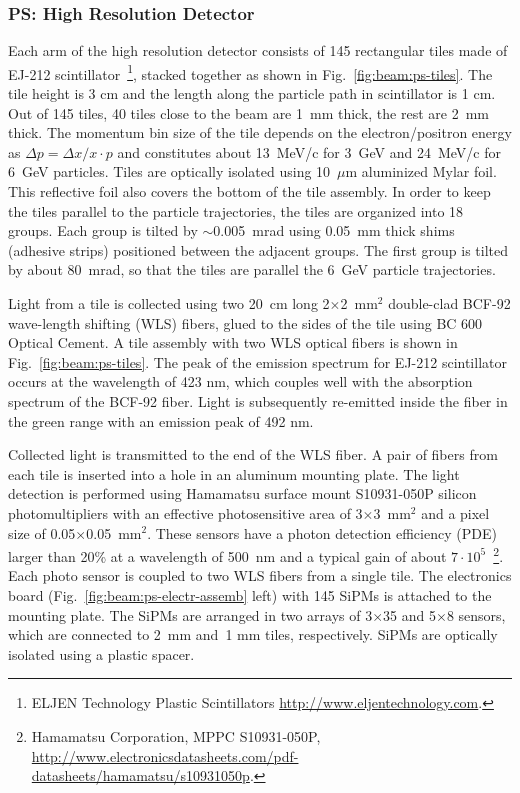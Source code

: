 \subsubsection[PS: High Resolution Detector]{PS: High Resolution Detector
  \label{sec:beamline:ps-hresol}
}

Each arm of the high resolution detector consists of 145 rectangular
tiles made of EJ-212 scintillator~\footnote{
  ELJEN Technology Plastic Scintillators \url{http://www.eljentechnology.com}. 
}, stacked together as
shown in Fig.~\ref{fig:beam:ps-tiles}. The tile height is 3 cm and the
length along the particle path in scintillator is 1 cm. Out of 145 tiles,
40 tiles close to the beam are 1~mm thick, the rest are 2~mm thick.
 The momentum
bin size of the tile depends on the electron/positron energy as 
$\Delta{}p=\Delta{}x/x\cdot{}p$ 
and constitutes about 13~MeV/c for 3~GeV and 24~MeV/c for 6~GeV particles.
Tiles are optically isolated using 10~$\mu$m
aluminized Mylar foil. This reflective foil also covers the bottom of
the tile assembly. In order to keep the tiles parallel to the
particle trajectories, the tiles are organized into 18 groups. Each
group is tilted by $\sim$0.005~mrad using 0.05~mm thick shims
(adhesive strips) positioned between the adjacent groups. The 
first group is tilted by about 80~mrad, so that the tiles are parallel
the 6~GeV particle trajectories.

Light from a tile is collected using two 20~cm long 2$\times$2~mm$^2$
double-clad BCF-92 wave-length shifting (WLS) fibers,
glued to the sides of the tile using BC 600 Optical Cement. A tile
assembly with two WLS optical fibers is shown in
Fig.~\ref{fig:beam:ps-tiles}. The peak of the emission spectrum for EJ-212
scintillator occurs at the wavelength of 423 nm, which couples well
with the absorption spectrum of the BCF-92 fiber. Light is
subsequently re-emitted inside the fiber in the green range with an
emission peak of 492 nm.

Collected light is transmitted to the end of the WLS fiber. A pair of
fibers from each tile is inserted into a hole in an aluminum mounting
plate. %
The light detection is performed using Hamamatsu
surface mount S10931-050P silicon photomultipliers with an effective
photosensitive area of 3$\times$3~mm$^2$ and a pixel size of 0.05$\times$0.05~mm$^2$.
These sensors have a photon detection efficiency (PDE) larger
than 20\% at a wavelength of 500~nm and a typical gain of about
$7\cdot{}10^5$~\footnote{
 Hamamatsu Corporation, MPPC S10931-050P, 
 \url{http://www.electronicsdatasheets.com/pdf-datasheets/hamamatsu/s10931050p}.
}.
Each photo sensor is coupled to two WLS fibers
from a single tile.
The electronics board (Fig.~\ref{fig:beam:ps-electr-assemb} left) 
with 145 SiPMs is attached
to the mounting plate.
The SiPMs are arranged in two arrays
of 3$\times$35 and 5$\times$8 sensors, which are connected to 2~mm and~1 mm
tiles, respectively. SiPMs are optically isolated using a plastic
spacer.



